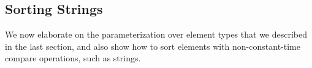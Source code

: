 \documentclass[acmsmall]{acmart}
\newcommand{\is}{\lstinline[language=isabelle]}
\begin{document}






\subsection{Sorting Strings}\label{sec:sorting_strings}
  We now elaborate on the parameterization over element types that we described in the last section, and also show how to sort elements with non-constant-time compare operations, such as strings.

  
  
  
\end{document}
